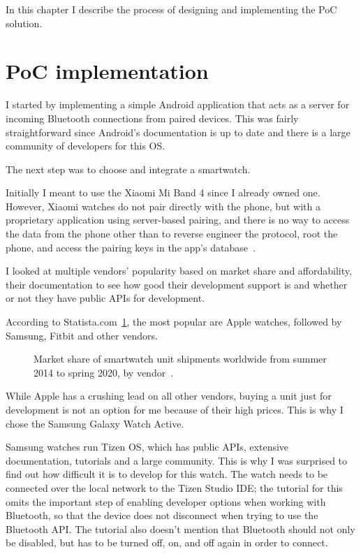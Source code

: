 In this chapter I describe the process of designing and implementing the PoC solution.

\section{PoC implementation}

I started by implementing a simple Android application that acts as a server for incoming Bluetooth connections from paired devices.
This was fairly straightforward since Android's documentation is up to date and there is a large community of developers for this OS.

The next step was to choose and integrate a smartwatch.

Initially I meant to use the Xiaomi Mi Band 4 since I already owned one.
However, Xiaomi watches do not pair directly with the phone, but with a proprietary application using server-based pairing,
and there is no way to access the data from the phone other than to reverse engineer the protocol, root the phone, and access the pairing keys in the app's database~\cite{miband4-server-based}.

I looked at multiple vendors' popularity based on market share and affordability, their documentation to see how good their development support is and whether or not they have public APIs for development.

According to Statista.com~\ref{fig:watch_market_share}, the most popular are Apple watches, followed by Samsung, Fitbit and other vendors.

\begin{figure}[h]
    \caption{Market share of smartwatch unit shipments worldwide from summer 2014 to spring 2020, by vendor~\cite{watch_market_share}.}
    \label{fig:watch_market_share}
\end{figure}

While Apple has a crushing lead on all other vendors, buying a unit just for development is not an option for me because of their high prices.
This is why I chose the Samsung Galaxy Watch Active.

Samsung watches run Tizen OS, which has public APIs, extensive documentation, tutorials and a large community.
This is why I was surprised to find out how difficult it is to develop for this watch.
The watch needs to be connected over the local network to the Tizen Studio IDE;
the tutorial for this~\cite{tizen_connect_tutorial} omits the important step of enabling developer options when working with Bluetooth,
so that the device does not disconnect when trying to use the Bluetooth API.
The tutorial also doesn't mention that Bluetooth should not only be disabled, but has to be turned off, on, and off again in order to connect.

